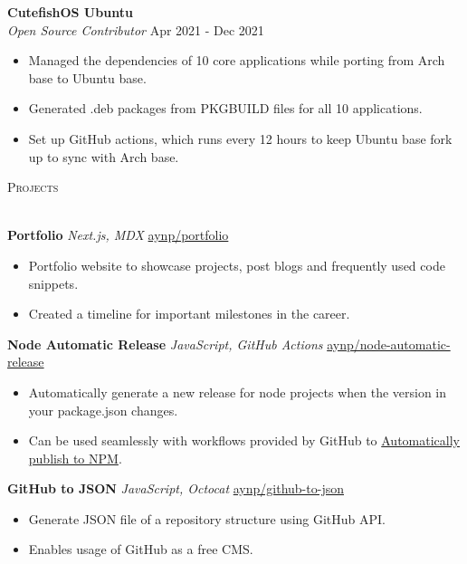 \documentclass[a4paper]{article}
\newcommand{\lineunder} {
    \vspace*{-8pt} \\
    \hspace*{-18pt} \hrulefill \\
}
\newcommand{\header} [1] {
    {\hspace*{-18pt}\vspace*{6pt} \textsc{#1}}
    \vspace*{-6pt} \lineunder
}
\begin{document}
\textbf{CutefishOS Ubuntu}\\
\textit{Open Source Contributor} \hfill Apr 2021 - Dec 2021\\
\begin{itemize}
	\item Managed the dependencies of 10 core applications while porting from Arch base to Ubuntu base.
	\item Generated .deb packages from PKGBUILD files for all 10 applications.
	\item Set up GitHub actions, which runs every 12 hours to keep Ubuntu base fork up to sync with Arch base.
\end{itemize}
\vspace{1.5mm}


\header{Projects}
\vspace{1mm}

{\textbf{Portfolio}} {\sl Next.js, MDX} \hfill \href{https://github.com/aynp/portfolio}{aynp/portfolio}\\
\begin{itemize}
	\item Portfolio website to showcase projects, post blogs and frequently used code snippets.
	\item Created a timeline for important milestones in the career.
\end{itemize}
\vspace*{1.5mm}

{\textbf{Node Automatic Release}} {\sl JavaScript, GitHub Actions} \hfill \href{https://github.com/aynp/node-automatic-release}{aynp/node-automatic-release}\\
\begin{itemize}
	\item Automatically generate a new release for node projects when the version in your package.json changes.
	\item Can be used seamlessly with workflows provided by GitHub to \href{https://aryanpathania.vercel.app/blog/automatic-npm-publish}{Automatically publish to NPM}.
\end{itemize}
\vspace*{1.5mm}

{\textbf{GitHub to JSON}} {\sl JavaScript, Octocat} \hfill \href{https://github.com/aynp/github-to-json}{aynp/github-to-json}\\
\begin{itemize}
	\item Generate JSON file of a repository structure using GitHub API.
	\item Enables usage of GitHub as a free CMS.
\end{itemize}
\vspace*{1.5mm}
\end{document}
